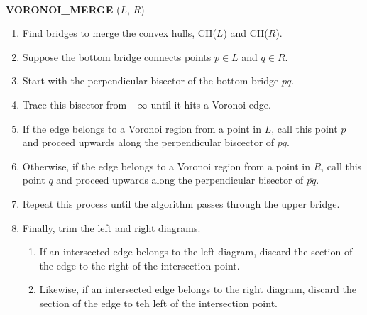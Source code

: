 \documentclass[12pt]{article}
\begin{document}
        \parbox{4.5in}{
        \hrulefill \\
        {\bf VORONOI\_MERGE} ($L$, $R$)
        \begin{enumerate}

            \item Find bridges to merge the convex hulls, CH($L$) and CH($R$).

            \item Suppose the bottom bridge connects points $p \in L$ and $q \in
            R$.
            \item Start with the perpendicular bisector of the bottom bridge
            $\overline{pq}$.

            \item Trace this bisector from $-\infty$ until it hits a Voronoi edge.

            \item If the edge belongs to a Voronoi region from a point in $L$,
            call this point $p$ and proceed upwards along the perpendicular
            biscector of $\overline{pq}$.

            \item Otherwise, if the edge belongs to a Voronoi region from a point
            in $R$, call this point $q$ and proceed upwards along the
            perpendicular bisector of $\overline{pq}$.

            \item Repeat this process until the algorithm passes through the upper
            bridge.

            \item Finally, trim the left and right diagrams.
                \begin{enumerate}
                \item If an intersected edge belongs to the left diagram, discard the
                section of the edge to the right of the intersection point. 
                \item Likewise, if an intersected edge belongs to the right diagram, 
                discard the section of the edge to teh left of the intersection point.
                \end{enumerate}
        \end{enumerate}
\hrulefill}
\end{document}
